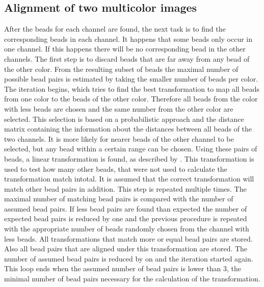 \subsection{Alignment of two multicolor images}
After the beads for each channel are found, the next task is to find the corresponding
beads in each channel. It happens that some beads only occur in one channel.
If this happens there will be no corresponding bead in the other
channels.\newline
The first step is to discard beads that are far away from any bead of the other color. From the resulting subset of beads the maximal number of possible bead pairs is estimated by taking the smaller number of beads per color.\newline
The iteration begins, which tries to find the best transformation to map all beads from one color to the beads of the other color. Therefore all beads from the color with less beads are chosen and the same number from the other color are selected. This selection is based on
a probabilistic approach and the distance matrix containing the information about the
distances between all beads of the two channels. It is more likely for nearer beads of the other channel to be selected, but any bead within a certain range can be chosen.\newline
Using these pairs of beads, a linear transformation is found, as described by
\cite{MAJoachim}.\newline
This transformation is used to test how many other beads, that were not used to calculate the transformation match intotal. It is assumed that the correct transformation will match other bead pairs in addition. 
This step is repeated multiple times.\newline
The maximal number of matching bead pairs is compared with the number of assumed bead pairs. If less bead pairs are found than expected the number of expected bead pairs is reduced by one and the previous procedure is repeated with the appropriate number of beads randomly chosen from the channel with less beads.\newline
All transformations that match more or equal bead pairs are stored. Also all bead pairs that are aligned under this transformation are stored. The number of assumed bead pairs is reduced by on and the iteration started again. \newline
This loop ends when the assumed number of bead pairs is lower than 3, the minimal number of bead pairs necessary for the calculation of the transformation.\newline
